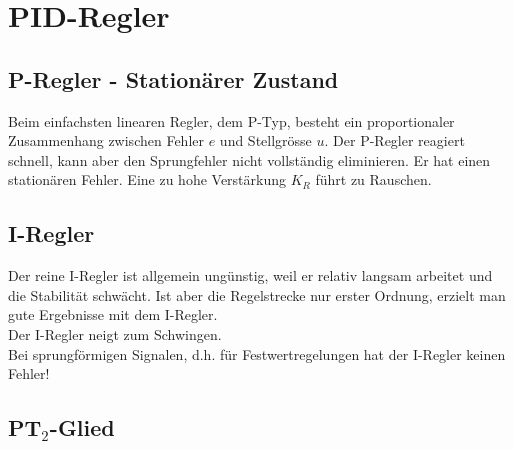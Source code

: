 \section{PID-Regler }

	\subsection{P-Regler - Stationärer Zustand }
		Beim einfachsten linearen Regler, dem P-Typ, besteht ein proportionaler
		Zusammenhang zwischen Fehler $e$ und Stellgrösse $u$.
		Der P-Regler reagiert schnell, kann aber den Sprungfehler nicht vollständig
		eliminieren. Er hat einen stationären Fehler. Eine zu hohe Verstärkung $K_R$ führt
    zu Rauschen.


	\subsection{I-Regler }
		Der reine I-Regler ist allgemein ungünstig, weil er relativ langsam arbeitet
		und die Stabilität schwächt. Ist aber die Regelstrecke nur erster Ordnung,
		erzielt man gute Ergebnisse mit dem I-Regler.\\
		Der I-Regler neigt zum Schwingen.\\
		Bei sprungförmigen Signalen, d.h. für Festwertregelungen hat der I-Regler
		keinen Fehler!


	\subsection{PT$_2$-Glied}
